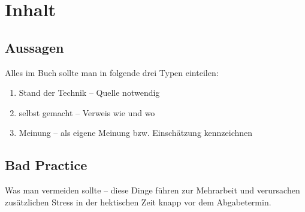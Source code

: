 \section{Inhalt}


\subsection{Aussagen}

Alles im Buch sollte man in folgende drei Typen einteilen:
\begin{enumerate}
\item Stand der Technik -- Quelle notwendig
\item selbst gemacht -- Verweis wie und wo
\item Meinung -- als eigene Meinung bzw. Einschätzung kennzeichnen
\end{enumerate}

\subsection{Bad Practice}

Was man vermeiden sollte -- diese Dinge führen zur Mehrarbeit und
verursachen zusätzlichen Stress in der hektischen Zeit knapp vor dem
Abgabetermin.



